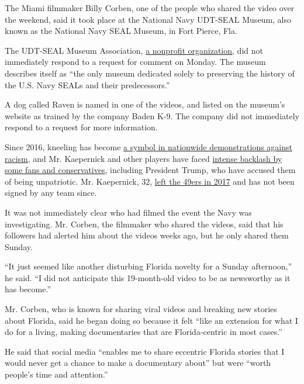 The Miami filmmaker Billy Corben, one of the people who shared the video
over the weekend, said it took place at the National Navy UDT-SEAL
Museum, also known as the National Navy SEAL Museum, in Fort Pierce,
Fla.

The UDT-SEAL Museum Association,
\href{https://www.navysealmuseum.org/about-the-navy-seal-museum/the-origin-of-the-national-navy-udt-seal-museum}{a
nonprofit organization}, did not immediately respond to a request for
comment on Monday. The museum describes itself as ``the only museum
dedicated solely to preserving the history of the U.S. Navy SEALs and
their predecessors.''

A dog called Raven is named in one of the videos, and listed on the
museum's website as trained by the company Baden K-9. The company did
not immediately respond to a request for more information.

Since 2016, kneeling has become
\href{https://www.nytimes.com/2020/06/05/sports/football/george-floyd-kaepernick-kneeling-nfl-protests.html}{a
symbol in nationwide demonstrations against racism}, and Mr. Kaepernick
and other players have faced
\href{https://www.nytimes.com/2019/02/15/sports/nfl-colin-kaepernick-protests-timeline.html}{intense
backlash by some fans and conservatives}, including President Trump, who
have accused them of being unpatriotic. Mr. Kaepernick, 32,
\href{https://www.nytimes.com/2017/03/27/sports/football/free-agent-colin-kaepernick-national-anthem-protest.html}{left
the 49ers in 2017} and has not been signed by any team since.

It was not immediately clear who had filmed the event the Navy was
investigating. Mr. Corben, the filmmaker who shared the videos, said
that his followers had alerted him about the videos weeks ago, but he
only shared them Sunday.

``It just seemed like another disturbing Florida novelty for a Sunday
afternoon,'' he said. ``I did not anticipate this 19-month-old video to
be as newsworthy as it has become.''

Mr. Corben, who is known for sharing viral videos and breaking new
stories about Florida, said he began doing so because it felt ``like an
extension for what I do for a living, making documentaries that are
Florida-centric in most cases.''

He said that social media ``enables me to share eccentric Florida
stories that I would never get a chance to make a documentary about''
but were ``worth people's time and attention.''

